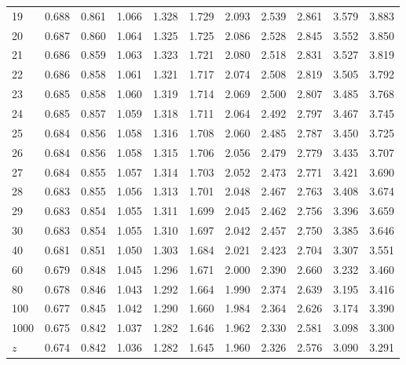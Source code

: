 \documentclass{article}
\begin{document}
\begin{center}
\begin{tabularx}{\linewidth}{*{11}{Y}}
19 & 0.688 & 0.861 & 1.066 & 1.328 & 1.729 & 2.093 & 2.539 & 2.861 & 3.579 & 3.883\\
20 & 0.687 & 0.860 & 1.064 & 1.325 & 1.725 & 2.086 & 2.528 & 2.845 & 3.552 & 3.850\\
21 & 0.686 & 0.859 & 1.063 & 1.323 & 1.721 & 2.080 & 2.518 & 2.831 & 3.527 & 3.819\\
22 & 0.686 & 0.858 & 1.061 & 1.321 & 1.717 & 2.074 & 2.508 & 2.819 & 3.505 & 3.792\\
23 & 0.685 & 0.858 & 1.060 & 1.319 & 1.714 & 2.069 & 2.500 & 2.807 & 3.485 & 3.768\\
24 & 0.685 & 0.857 & 1.059 & 1.318 & 1.711 & 2.064 & 2.492 & 2.797 & 3.467 & 3.745\\
25 & 0.684 & 0.856 & 1.058 & 1.316 & 1.708 & 2.060 & 2.485 & 2.787 & 3.450 & 3.725\\
26 & 0.684 & 0.856 & 1.058 & 1.315 & 1.706 & 2.056 & 2.479 & 2.779 & 3.435 & 3.707\\
27 & 0.684 & 0.855 & 1.057 & 1.314 & 1.703 & 2.052 & 2.473 & 2.771 & 3.421 & 3.690\\
28 & 0.683 & 0.855 & 1.056 & 1.313 & 1.701 & 2.048 & 2.467 & 2.763 & 3.408 & 3.674\\
29 & 0.683 & 0.854 & 1.055 & 1.311 & 1.699 & 2.045 & 2.462 & 2.756 & 3.396 & 3.659\\
30 & 0.683 & 0.854 & 1.055 & 1.310 & 1.697 & 2.042 & 2.457 & 2.750 & 3.385 & 3.646\\
40 & 0.681 & 0.851 & 1.050 & 1.303 & 1.684 & 2.021 & 2.423 & 2.704 & 3.307 & 3.551\\
60 & 0.679 & 0.848 & 1.045 & 1.296 & 1.671 & 2.000 & 2.390 & 2.660 & 3.232 & 3.460\\
80 & 0.678 & 0.846 & 1.043 & 1.292 & 1.664 & 1.990 & 2.374 & 2.639 & 3.195 & 3.416\\
100 & 0.677 & 0.845 & 1.042 & 1.290 & 1.660 & 1.984 & 2.364 & 2.626 & 3.174 & 3.390\\
1000 & 0.675 & 0.842 & 1.037 & 1.282 & 1.646 & 1.962 & 2.330 & 2.581 & 3.098 & 3.300\\
$z$ & 0.674 & 0.842 & 1.036 & 1.282 & 1.645 & 1.960 & 2.326 & 2.576 & 3.090 & 3.291\\
\bottomrule
    \end{tabularx}
  \end{center}
\end{document}
